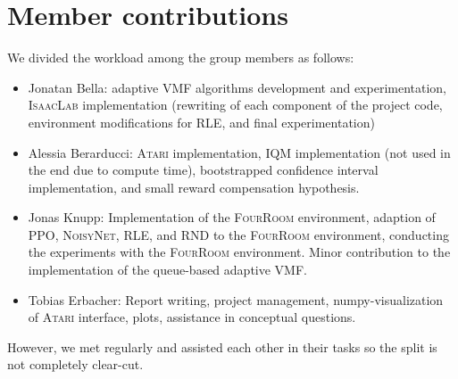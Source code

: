 \documentclass[10pt]{article} %
\begin{document}
\clearpage
\section*{Member contributions}

We divided the workload among the group members as follows:

\begin{itemize}
  \item Jonatan Bella: adaptive VMF algorithms development and experimentation, \textsc{IsaacLab} implementation (rewriting of each component of the project code, environment modifications for \textsc{RLE}, and final experimentation)
  \item Alessia Berarducci: \textsc{Atari} implementation, IQM implementation (not used in the end due to compute time), bootstrapped confidence interval implementation, and small reward compensation hypothesis.
  \item Jonas Knupp: Implementation of the \textsc{FourRoom} environment, adaption of \textsc{PPO}, \textsc{NoisyNet}, \textsc{RLE}, and \textsc{RND} to the \textsc{FourRoom} environment, conducting the experiments with the \textsc{FourRoom} environment. Minor contribution to the implementation of the queue-based adaptive VMF.
  \item Tobias Erbacher: Report writing, project management, numpy-visualization of \textsc{Atari} interface, plots, assistance in conceptual questions.
\end{itemize}

\noindent However, we met regularly and assisted each other in their tasks so the split is not completely clear-cut.






\end{document}
